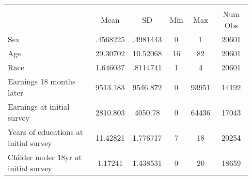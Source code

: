 {
\def\sym#1{\ifmmode^{#1}\else\(^{#1}\)\fi}
\begin{tabular}{l*{1}{ccccc}}
\hline\hline
            &\multicolumn{5}{c}{}                                            \\
            &        Mean&          SD&         Min&         Max&     Num Obs\\
\hline
Sex         &    .4568225&    .4981443&           0&           1&       20601\\
Age         &    29.30702&    10.52068&          16&          82&       20601\\
Race        &    1.646037&    .8114741&           1&           4&       20601\\
Earnings 18 months later&    9513.183&    9546.872&           0&       93951&       14192\\
Earnings at initial survey&    2810.803&     4050.78&           0&       64436&       17043\\
Years of educations at initial survey&    11.42821&    1.776717&           7&          18&       20254\\
Childer under 18yr at initial survey&     1.17241&    1.438531&           0&          20&       18659\\
\hline\hline
\end{tabular}
}

